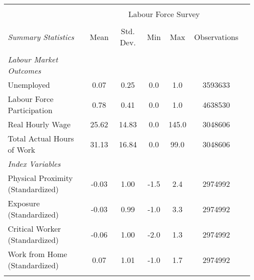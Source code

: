 \begin{tabular*}{\hsize}{ @{\extracolsep{\fill}}l*{6}{c}}
\hline\hline
\\
 &\multicolumn{5}{c}{Labour Force Survey} \\
\cline{2-6} \\
\textit{Summary Statistics}
                                                  &Mean&Std. Dev.& Min& Max&Observations\\
\hline
\\
\hspace{0.5cm}\textit{Labour Market Outcomes}                   &    &    &    &    &    \\[0.25em]
\hspace{0.5cm}Unemployed                                        &0.07&0.25& 0.0& 1.0&3593633\\[0.25em]
\hspace{0.5cm}Labour Force Participation                        &0.78&0.41& 0.0& 1.0&4638530\\[0.25em]
\hspace{0.5cm}Real Hourly Wage                                  &25.62&14.83& 0.0&145.0&3048606\\[0.25em]
\hspace{0.5cm}Total Actual Hours of Work                        &31.13&16.84& 0.0&99.0&3048606\\[0.25em]
\hspace{0.5cm}\textit{Index Variables}                          &    &    &    &    &    \\[0.25em]
\hspace{0.5cm}Physical Proximity (Standardized)                 &-0.03&1.00&-1.5& 2.4&2974992\\[0.25em]
\hspace{0.5cm}Exposure (Standardized)                           &-0.03&0.99&-1.0& 3.3&2974992\\[0.25em]
\hspace{0.5cm}Critical Worker (Standardized)                    &-0.06&1.00&-2.0& 1.3&2974992\\[0.25em]
\hspace{0.5cm}Work from Home (Standardized)                     &0.07&1.01&-1.0& 1.7&2974992\\
\\
\hline \hline
\end{tabular*}
